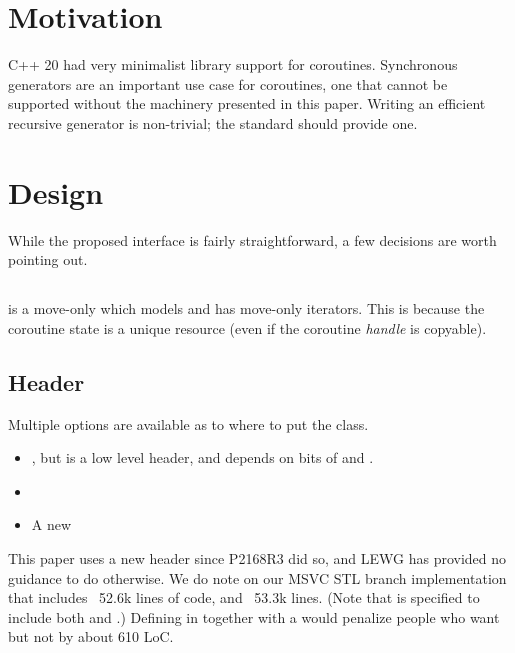 \documentclass{wg21}
\begin{document}
\section{Motivation}

C++ 20 had very minimalist library support for coroutines.
Synchronous generators are an important use case for coroutines,
one that cannot be supported
without the machinery presented in this paper.
Writing an efficient recursive generator is non-trivial;
the standard should provide one.


\section{Design}

While the proposed  interface is fairly straightforward, a few decisions are worth pointing out.

\subsection{}

 is a move-only  which models  and has move-only iterators.
This is because the coroutine state is a unique resource (even if the coroutine \textit{handle} is copyable).


\subsection{Header}

Multiple options are available as to where to put the  class.

\begin{itemize}
\item {}, but  is a low level header,
  and  depends on bits of  and .

\item {}

\item A new 
\end{itemize}

This paper uses a new  header since P2168R3 did so,
and LEWG has provided no guidance to do otherwise.
We do note on our MSVC STL branch implementation that
 includes ~52.6k lines of code, and
 ~53.3k lines.
(Note that  is specified to include
both  and .)
Defining  in 
together with a 
would penalize people who want 
but not  by about 610 LoC.
\end{document}
